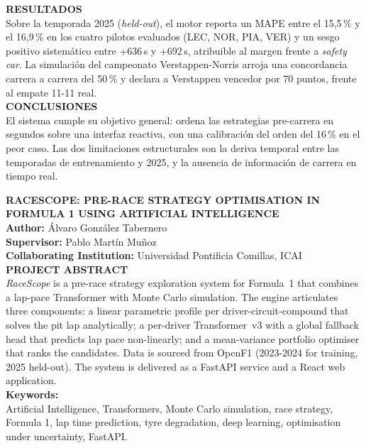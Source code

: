\documentclass[12pt, a4paper]{book}
\begin{document}
\noindent \textbf{RESULTADOS}\\
Sobre la temporada 2025 (\textit{held-out}), el motor reporta un MAPE entre el 15{,}5\,\% y el 16{,}9\,\% en los cuatro pilotos evaluados (LEC, NOR, PIA, VER) y un sesgo positivo sistemático entre +636\,s y +692\,s, atribuible al margen frente a \textit{safety car}. La simulación del campeonato Verstappen-Norris arroja una concordancia carrera a carrera del 50\,\% y declara a Verstappen vencedor por 70 puntos, frente al empate 11-11 real.\\

\noindent \textbf{CONCLUSIONES}\\
El sistema cumple su objetivo general: ordena las estrategias pre-carrera en segundos sobre una interfaz reactiva, con una calibración del orden del 16\,\% en el peor caso. Las dos limitaciones estructurales son la deriva temporal entre las temporadas de entrenamiento y 2025, y la ausencia de información de carrera en tiempo real.\\

\cleardoublepage

\noindent
\textbf{\large RACESCOPE: PRE-RACE STRATEGY OPTIMISATION IN FORMULA 1 USING ARTIFICIAL INTELLIGENCE}\\

\noindent
\textbf{Author:} Álvaro González Tabernero\\
\textbf{Supervisor:} Pablo Martín Muñoz\\
\textbf{Collaborating Institution:} Universidad Pontificia Comillas, ICAI\\

\noindent
\textbf{PROJECT ABSTRACT}\\
\textit{RaceScope} is a pre-race strategy exploration system for Formula~1 that combines a lap-pace Transformer with Monte Carlo simulation. The engine articulates three components: a linear parametric profile per driver-circuit-compound that solves the pit lap analytically; a per-driver Transformer~v3 with a global fallback head that predicts lap pace non-linearly; and a mean-variance portfolio optimiser that ranks the candidates. Data is sourced from OpenF1 (2023-2024 for training, 2025 held-out). The system is delivered as a FastAPI service and a React web application.\\

\noindent \textbf{Keywords:}\\
Artificial Intelligence, Transformers, Monte Carlo simulation, race strategy,
Formula 1, lap time prediction, tyre degradation, deep learning,
optimisation under uncertainty, FastAPI.\\
\end{document}

